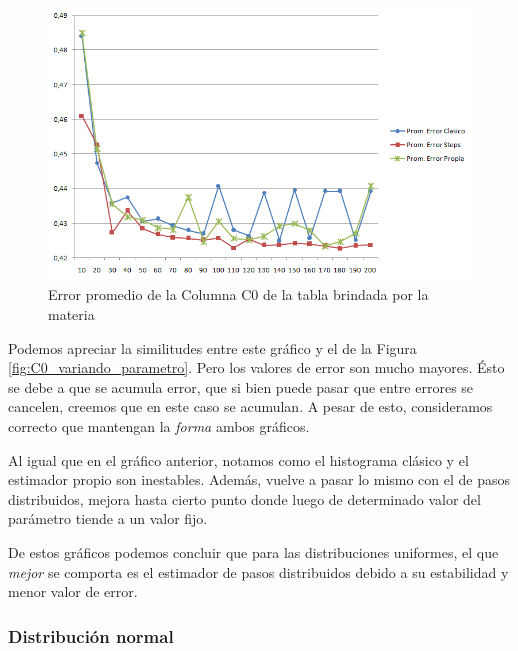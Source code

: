 \begin{itemize}
\begin{figure}[H]
	  \begin{center}
	    \includegraphics[scale=.75]{imagenes/parametroVariableC0Greater.png}
	    \caption{Error promedio de la Columna C0 de la tabla brindada por la materia} 
	    \label{fig:C0_variando_parametro_greater}
	  \end{center}
\end{figure}

\quad Podemos apreciar la similitudes entre este gr\'afico y el de la Figura	 \ref{fig:C0_variando_parametro}. Pero los valores de error son mucho mayores. \'Esto se debe a que se acumula error, que si bien puede pasar que entre errores se cancelen, creemos que en este caso se acumulan. A pesar de esto, consideramos correcto que mantengan la \textit{forma} ambos gr\'aficos.

\quad Al igual que en el gr\'afico anterior, notamos como el histograma cl\'asico y el estimador propio son inestables. Adem\'as, vuelve a pasar lo mismo con el de pasos distribuidos, mejora hasta cierto punto donde luego de determinado valor del par\'ametro tiende a un valor fijo.

\quad De estos gr\'aficos podemos concluir que para las distribuciones uniformes, el que \textit{mejor} se comporta es el estimador de pasos distribuidos debido a su estabilidad y menor valor de error.

\end{itemize}

\subsubsection{Distribuci\'on normal}

